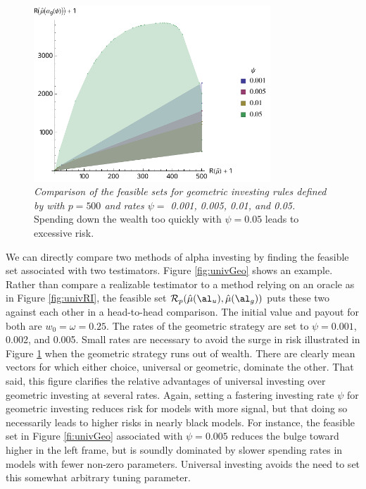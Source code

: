 \documentclass[12pt]{article}
\begin{document}
\begin{figure}
 \caption{ \label{fig:geom} {\sl Comparison of the feasible sets for geometric
 investing rules defined by  with $p=500$ and rates $\psi=$ 0.001,
 0.005, 0.01, and 0.05.}  Spending down the wealth too quickly with $\psi=0.05$
 leads to excessive risk.  }

 \vspace{0.1in}
 \centerline{
   \includegraphics[width=3.5in]{figures/geom}     }
 \vspace{0.2in}
\end{figure}


 We can directly compare two methods of alpha investing by finding the feasible
 set associated with two testimators.  Figure \ref{fig:univGeo} shows an
 example.  Rather than compare a realizable testimator to a method relying on an
 oracle as in Figure \ref{fig:univRI}, the feasible set ${\cal R}_p
 (\hat\mu(\al_u), \hat\mu(\al_g))$ puts these two against each other in a
 head-to-head comparison.  The initial value and payout for both are $w_0 =
 \omega = 0.25$.  The rates of the geometric strategy are set to $\psi=0.001$,
 0.002, and 0.005.  Small rates are necessary to avoid the surge in risk
 illustrated in Figure \ref{fig:geom} when the geometric strategy runs out of
 wealth.  There are clearly mean vectors for which either choice, universal or
 geometric, dominate the other.  That said, this figure clarifies the relative
 advantages of universal investing over geometric investing at several rates.
  Again, setting a fastering investing rate $\psi$ for geometric investing
 reduces risk for models with more signal, but that doing so necessarily leads
 to higher risks in nearly black models.  For instance, the feasible set in
 Figure \ref{fi:univGeo} associated with $\psi = 0.005$ reduces the bulge toward
 higher in the left frame, but is soundly dominated by slower spending rates in
 models with fewer non-zero parameters.  Universal investing avoids the need to
 set this somewhat arbitrary tuning parameter.
\end{document}
